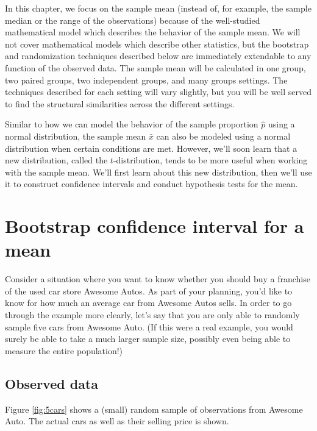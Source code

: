 \documentclass[
  10pt,
  openany]{book}
\begin{document}
In this chapter, we focus on the sample mean (instead of, for example, the sample median or the range of the observations) because of the well-studied mathematical model which describes the behavior of the sample mean.
We will not cover mathematical models which describe other statistics, but the bootstrap and randomization techniques described below are immediately extendable to any function of the observed data.
The sample mean will be calculated in one group, two paired groups, two independent groups, and many groups settings.
The techniques described for each setting will vary slightly, but you will be well served to find the structural similarities across the different settings.

Similar to how we can model the behavior of the sample proportion \(\hat{p}\) using a normal distribution, the sample mean \(\bar{x}\) can also be modeled using a normal distribution when certain conditions are met.
 However, we'll soon learn that a new distribution, called the \(t\)-distribution, tends to be more useful when working with the sample mean.
We'll first learn about this new distribution, then we'll use it to construct confidence intervals and conduct hypothesis tests for the mean.

\hypertarget{boot1mean}{%
\section{Bootstrap confidence interval for a mean}\label{boot1mean}}

Consider a situation where you want to know whether you should buy a franchise of the used car store Awesome Autos.
As part of your planning, you'd like to know for how much an average car from Awesome Autos sells.
In order to go through the example more clearly, let's say that you are only able to randomly sample five cars from Awesome Auto.
(If this were a real example, you would surely be able to take a much larger sample size, possibly even being able to measure the entire population!)

\hypertarget{observed-data-10}{%
\subsection{Observed data}\label{observed-data-10}}

Figure \ref{fig:5cars} shows a (small) random sample of observations from Awesome Auto.
The actual cars as well as their selling price is shown.
\end{document}
